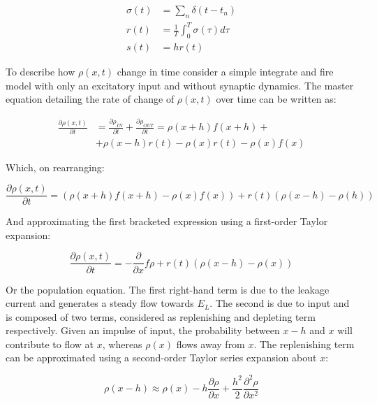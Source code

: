 		\begin{equation}
			\begin{aligned}
				\sigma(t) &= \sum\limits_n\delta(t-t_n)\\
				r(t) &= \frac{1}{T}\int_0^T\sigma(\tau)d\tau\\
				s(t) &= hr(t)
			\end{aligned}
		\end{equation}

		To describe how $\rho(x,t)$ change in time consider a simple integrate and fire model with only an excitatory input and without synaptic dynamics.
		The master equation detailing the rate of change of $\rho(x,t)$ over time can be written as:

		\begin{equation}
			\begin{aligned}
				\frac{\partial\rho(x,t)}{\partial t} &= \frac{\partial\rho_{IN}}{\partial t} + \frac{\partial\rho_{OUT}}{\partial t} =\rho(x + h)f(x+h)+\\
																						 &+\rho(x-h)r(t)-\rho(x)r(t)-\rho(x)f(x)
			\end{aligned}
		\end{equation}

		Which, on rearranging:

		\begin{equation}
			\frac{\partial\rho(x,t)}{\partial t} = (\rho(x+h)f(x+h)-\rho(x)f(x))+r(t)(\rho(x-h)-\rho(h))
		\end{equation}

		And approximating the first bracketed expression using a first-order Taylor expansion:

		\begin{equation}
			\frac{\partial\rho(x,t)}{\partial t} = -\frac{\partial}{\partial x}f\rho + r(t)(\rho(x-h)-\rho(x))
			\label{eqs:population}
		\end{equation}

		Or the population equation.
		The first right-hand term is due to the leakage current and generates a steady flow towards $E_L$.
		The second is due to input and is composed of two terms, considered as replenishing and depleting term respectively.
		Given an impulse of input, the probability between $x-h$ and $x$ will contribute to flow at $x$, whereas $\rho(x)$ flows away from $x$.
		The replenishing term can be approximated using a second-order Taylor series expansion about $x$:

		\begin{equation}
			\rho(x-h)\approx \rho(x) - h\frac{\partial\rho}{\partial x}+\frac{h^2}{2}\frac{\partial^2\rho}{\partial x^2}
		\end{equation}

